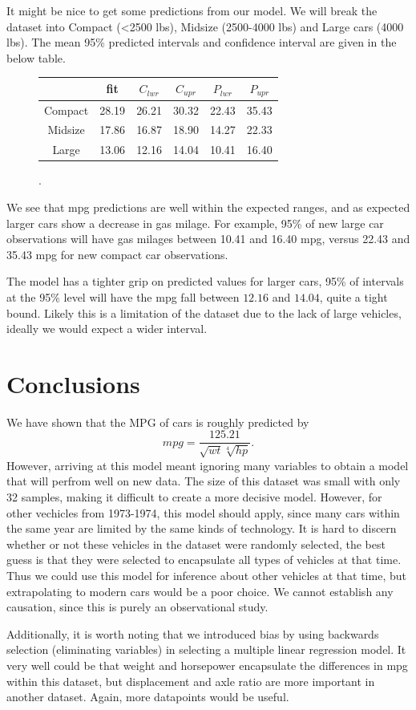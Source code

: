 \documentclass[a4paper]{article}
\begin{document}
It might be nice to get some predictions from our model. We will break the dataset into Compact (<2500 lbs), Midsize (2500-4000 lbs) and Large cars (4000 lbs). The mean 95\% predicted intervals and confidence interval are given in the below table.


\begin{figure}[H]
\centering
\begin{tabular}{c|c|c|c|c|c}
	&fit & \(C_{lwr}\) & \(C_{upr}\) & \(P_{lwr}\) & \(P_{upr}\) \\
	\hline
	Compact &28.19 & 26.21 &30.32 &22.43 & 35.43\\	\hline
	Midsize & 17.86 & 16.87 &18.90 &14.27 & 22.33\\	\hline
	Large & 13.06 & 12.16 &14.04 &10.41 & 16.40
\end{tabular}.
\end{figure}
We see that mpg predictions are well within the expected ranges, and as expected larger cars show a decrease in gas milage. For example, 95\% of new large car observations will have gas milages between 10.41 and 16.40 mpg, versus 22.43 and 35.43 mpg for new compact car observations.

The model has a tighter grip on predicted values for larger cars, 95\% of intervals at the 95\% level will have the mpg fall between \(12.16\) and \(14.04\), quite a tight bound. Likely this is a limitation of the dataset due to the lack of large vehicles, ideally we would expect a wider interval.
\section{Conclusions}
We have shown that the MPG of cars is roughly predicted by 
\begin{equation}
	mpg = \frac{125.21}{\sqrt{wt}\sqrt[4]{hp}}.
\end{equation}
However, arriving at this model meant ignoring many variables to obtain a model that will perfrom well on new data. The size of this dataset was small with only 32 samples, making it difficult to create a more decisive model. However, for other vechicles from 1973-1974, this model should apply, since many cars within the same year are limited by the same kinds of technology. It is hard to discern whether or not these vehicles in the dataset were randomly selected, the best guess is that they were selected to encapsulate all types of vehicles at that time. Thus we could use this model for inference about other vehicles at that time, but extrapolating to modern cars would be a poor choice. We cannot establish any causation, since this is purely an observational study. 

Additionally, it is worth noting that we introduced bias by using backwards selection (eliminating variables) in selecting a multiple linear regression model. It very well could be that weight and horsepower encapsulate the differences in mpg within this dataset, but displacement and axle ratio are more important in another dataset. Again, more datapoints would be useful.

\nocite{*}
\printbibliography
\end{document}
